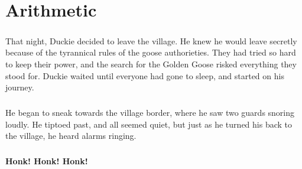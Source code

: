 \chapter{Arithmetic}
\paragraph{} That night, Duckie decided to leave the village. He knew he would leave secretly because of the tyrannical rules of the goose authorieties. They had tried so hard to keep their power, and the search for the Golden Goose risked everything they stood for. Duckie waited until everyone had gone to sleep, and started on his journey.
\paragraph{} He began to sneak towards the village border, where he saw two guards snoring loudly. He tiptoed past, and all seemed quiet, but just as he turned his back to the village, he heard alarms ringing. 
\paragraph{} \textbf{Honk! Honk! Honk!}
